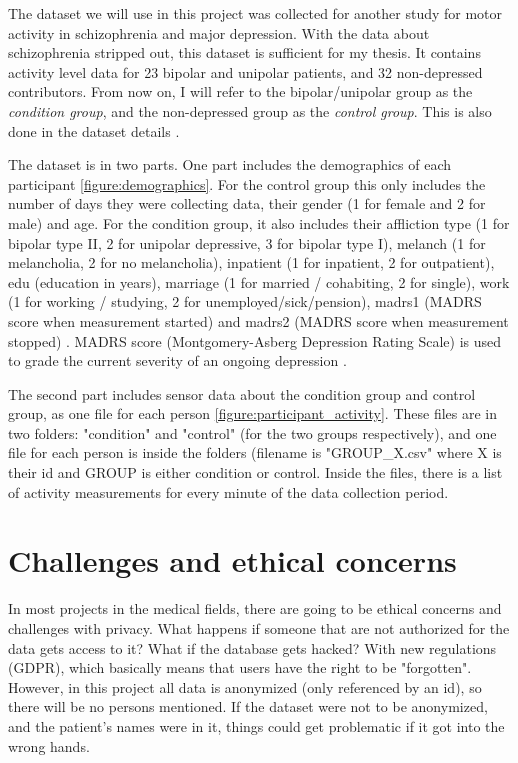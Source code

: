 The dataset we will use in this project \cite{dataset} was collected for another study for motor activity in schizophrenia and major depression. 
With the data about schizophrenia stripped out, this dataset is sufficient for my thesis. It contains activity level data for 23 bipolar and unipolar patients, 
and 32 non-depressed contributors. From now on, I will refer to the bipolar/unipolar group as the \textit{condition group}, and the non-depressed group as 
the \textit{control group}. This is also done in the dataset details \cite{dataset_details}.

The dataset is in two parts. One part includes the demographics of each participant \ref{figure:demographics}. For the control group this only includes the number of 
days they were collecting data, their gender (1 for female and 2 for male) and age. For the condition group, it also includes their affliction type (1 for bipolar
type II, 2 for unipolar depressive, 3 for bipolar type I), melanch (1 for melancholia, 2 for no melancholia), inpatient (1 for inpatient, 2 for outpatient),
edu (education in years), marriage (1 for married / cohabiting, 2 for single), work (1 for working / studying, 2 for unemployed/sick/pension), madrs1 (MADRS score 
when measurement started) and madrs2 (MADRS score when measurement stopped) \cite{dataset_details}. MADRS score (Montgomery-Asberg Depression Rating Scale) 
is used to grade the current severity of an ongoing depression \cite{dataset_details}.

The second part includes sensor data about the condition group and control group, as one file for each person \ref{figure:participant_activity}. 
These files are in two folders: "condition" and "control" (for the two groups respectively), and one file for each person is inside the folders (filename 
is "GROUP\_X.csv" where X is their id and GROUP is either condition or control. Inside the files, there is a list of activity measurements for every 
minute of the data collection period.


\section{Challenges and ethical concerns}
In most projects in the medical fields, there are going to be ethical concerns and challenges with privacy. What happens if someone that are not authorized for 
the data gets access to it? What if the database gets hacked? With new regulations (GDPR), which basically means that users have the right to be "forgotten". 
However, in this project all data is anonymized (only referenced by an id), so there will be no persons mentioned. If the dataset were not to be anonymized, 
and the patient's names were in it, things could get problematic if it got into the wrong hands. 



